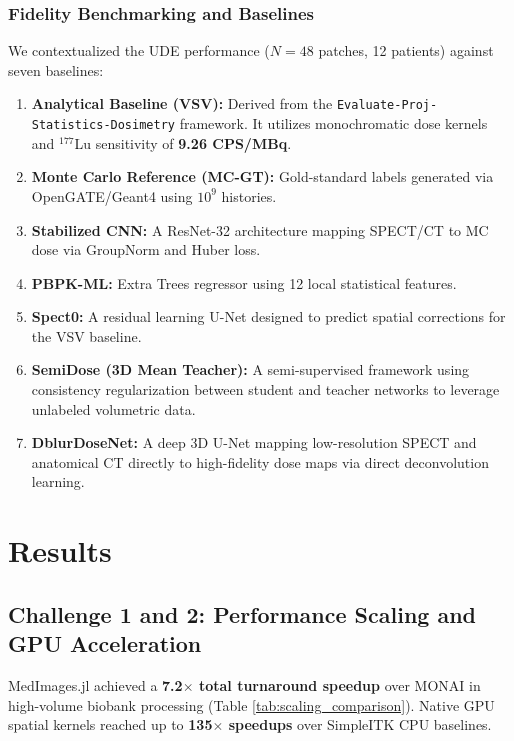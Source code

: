 \documentclass[10pt,letterpaper]{article}
\begin{document}
\subsubsection*{Fidelity Benchmarking and Baselines}
We contextualized the UDE performance ($N=48$ patches, 12 patients) against seven baselines:
\begin{enumerate}
    \item \textbf{Analytical Baseline (VSV):} Derived from the \texttt{Evaluate-Proj-Statistics-Dosimetry} framework. It utilizes monochromatic dose kernels and $^{177}$Lu sensitivity of \textbf{9.26 CPS/MBq}.
    \item \textbf{Monte Carlo Reference (MC-GT):} Gold-standard labels generated via OpenGATE/Geant4 using $10^9$ histories.
    \item \textbf{Stabilized CNN:} A ResNet-32 architecture mapping SPECT/CT to MC dose via GroupNorm and Huber loss.
    \item \textbf{PBPK-ML:} Extra Trees regressor using 12 local statistical features.
    \item \textbf{Spect0:} A residual learning U-Net designed to predict spatial corrections for the VSV baseline.
    \item \textbf{SemiDose (3D Mean Teacher):} A semi-supervised framework using consistency regularization between student and teacher networks to leverage unlabeled volumetric data.
    \item \textbf{DblurDoseNet:} A deep 3D U-Net mapping low-resolution SPECT and anatomical CT directly to high-fidelity dose maps via direct deconvolution learning.
\end{enumerate}

\section{Results}

\subsection*{Challenge 1 and 2: Performance Scaling and GPU Acceleration}
MedImages.jl achieved a \textbf{7.2$\times$ total turnaround speedup} over MONAI in high-volume biobank processing (Table \ref{tab:scaling_comparison}). Native GPU spatial kernels reached up to \textbf{135$\times$ speedups} over SimpleITK CPU baselines.
\end{document}
